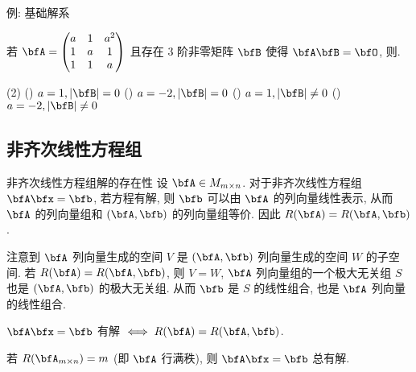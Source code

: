 \begin{frame}{例: 基础解系}
	\onslide<+->
	\begin{exercise}
		若 $\bfA=\begin{pmatrix}
			a&1&a^2\\
			1&a&1\\
			1&1&a
		\end{pmatrix}$ 且存在 $3$ 阶非零矩阵 $\bfB$ 使得 $\bfA\bfB=\bfO$, 则.
		\begin{taskschoice}(2)
			() $a=1,|\bfB|=0$
			() $a=-2,|\bfB|=0$
			() $a=1,|\bfB|\neq0$
			() $a=-2,|\bfB|\neq0$
		\end{taskschoice}
	\end{exercise}
\end{frame}


\subsection{非齐次线性方程组}

\begin{frame}{非齐次线性方程组解的存在性}
	\onslide<+->
	设 $\bfA\in M_{m\times n}$.
	\onslide<+->
	对于非齐次线性方程组 $\bfA\bfx=\bfb$,
	\onslide<+->
	若方程有解, 则 $\bfb$ 可以由 $\bfA$ 的列向量线性表示, 从而 $\bfA$ 的列向量组和 $(\bfA,\bfb)$ 的列向量组等价.
	\onslide<+->
	因此 $R(\bfA)=R(\bfA,\bfb)$.

	\onslide<+->
	注意到 $\bfA$ 列向量生成的空间 $V$ 是 $(\bfA,\bfb)$ 列向量生成的空间 $W$ 的子空间.
	\onslide<+->
	若 $R(\bfA)=R(\bfA,\bfb)$, 则 $V=W$, $\bfA$ 列向量组的一个极大无关组 $S$ 也是 $(\bfA,\bfb)$ 的极大无关组.
	\onslide<+->
	从而 $\bfb$ 是 $S$ 的线性组合, 也是 $\bfA$ 列向量的线性组合.

	\onslide<+->
	\begin{theorem}
		$\bfA \bfx=\bfb$ 有解 $\iff R(\bfA)=R(\bfA,\bfb)$.
	\end{theorem}
	\onslide<+->
	\begin{corollary}
		若 $R(\bfA_{m\times n})=m$ (即 $\bfA$ 行满秩), 则 $\bfA \bfx=\bfb$ 总有解.
	\end{corollary}
\end{frame}


